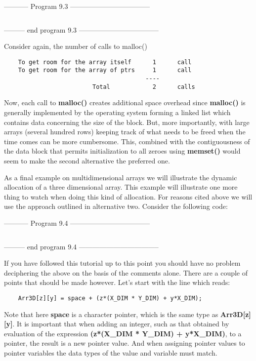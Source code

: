 -----------  Program 9.3  -----------------------------------
\inputminted{c}{../src/ch9-3.c}
--------- end program 9.3 -----------------------------------

Consider again, the number of calls to malloc()

\begin{verbatim}
    To get room for the array itself      1      call
    To get room for the array of ptrs     1      call
                                        ----
                         Total            2      calls
\end{verbatim}

Now, each call to \textbf{malloc()} creates additional space overhead
since \textbf{malloc()} is generally implemented by the operating system
forming a linked list which contains data concerning the size of the
block. But, more importantly, with large arrays (several hundred rows)
keeping track of what needs to be freed when the time comes can be more
cumbersome. This, combined with the contiguousness of the data block
that permits initialization to all zeroes using \textbf{memset()} would
seem to make the second alternative the preferred one.

As a final example on multidimensional arrays we will illustrate the
dynamic allocation of a three dimensional array. This example will
illustrate one more thing to watch when doing this kind of allocation.
For reasons cited above we will use the approach outlined in alternative
two. Consider the following code:

-----------  Program 9.4  -----------------------------------
\inputminted{c}{../src/ch9-4.c}
--------- end program 9.4 -----------------------------------

If you have followed this tutorial up to this point you should have no
problem deciphering the above on the basis of the comments alone. There
are a couple of points that should be made however. Let's start with the
line which reads:

\begin{verbatim}
    Arr3D[z][y] = space + (z*(X_DIM * Y_DIM) + y*X_DIM);
\end{verbatim}

Note that here \textbf{space} is a character pointer, which is the same
type as \textbf{Arr3D{[}z{]}{[}y{]}}. It is important that when adding
an integer, such as that obtained by evaluation of the expression
\textbf{(z*(X\_DIM * Y\_DIM) + y*X\_DIM)}, to a pointer, the result is a
new pointer value. And when assigning pointer values to pointer
variables the data types of the value and variable must match.

\begin{comment}
\href{ch10x.htm}{Chapter 10: Pointers to Functions}

\href{pointers.htm}{Back to Table of Contents}
\end{comment}

